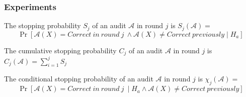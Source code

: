 \documentclass{beamer}
\begin{document}
\begin{frame}
\frametitle{Experiments}
\begin{definition}
The stopping probability $S_j$ of an audit $\mathcal{A}$ in round $j$ is 
$S_j(\mathcal{A})=$
$$\Pr[\mathcal{A}(X)=Correct ~in~round~j~\land \mathcal{A}(X) \neq Correct ~previously \mid H_a]$$
\end{definition}

\begin{definition}
The cumulative stopping probability $C_j$ of an audit $\mathcal{A}$ in round $j$ is $C_j(\mathcal{A})= \sum_{i=1}^j S_j$
\end{definition}

\begin{definition}
The conditional stopping probability  of an audit $\mathcal{A}$ in round $j$ is 
$\chi_j (\mathcal{A})=$
$$\Pr[\mathcal{A}(X)=Correct ~in~round~j~\mid H_a \land \mathcal{A}(X) \neq Correct ~previously]$$
\end{definition}
\end{frame}
\end{document}
